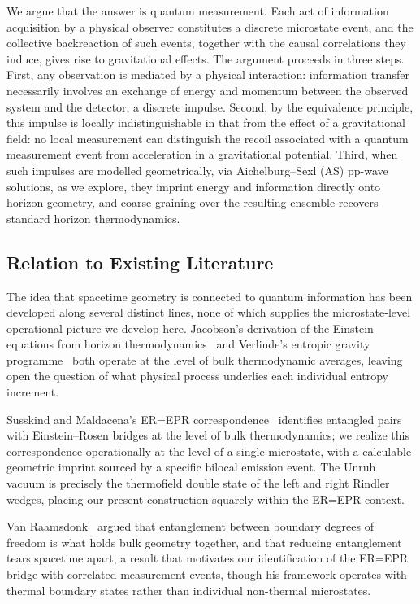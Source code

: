 \documentclass[12pt,a4paper]{article}
\begin{document}
We argue that the answer is quantum measurement. Each act of information acquisition by a physical observer constitutes a discrete microstate event, and the collective backreaction of such events, together with the causal correlations they induce, gives rise to gravitational effects. The argument proceeds in three steps. First, any observation is mediated by a physical interaction: information transfer necessarily involves an exchange of energy and momentum between the observed system and the detector, a discrete impulse. Second, by the equivalence principle, this impulse is locally indistinguishable in that from the effect of a gravitational field: no local measurement can distinguish the recoil associated with a quantum measurement event from acceleration in a gravitational potential. Third, when such impulses are modelled geometrically, via Aichelburg--Sexl (AS) pp-wave solutions, as we explore, they imprint energy and information directly onto horizon geometry, and coarse-graining over the resulting ensemble recovers standard horizon thermodynamics. 

\subsection{Relation to Existing Literature}
The idea that spacetime geometry is connected to quantum information 
has been developed along several distinct lines, none of which supplies 
the microstate-level operational picture we develop here. Jacobson's 
derivation of the Einstein equations from horizon thermodynamics~\cite{jacobson1995thermodynamics} 
and Verlinde's entropic gravity programme~\cite{entropic} both operate 
at the level of bulk thermodynamic averages, leaving open the question 
of what physical process underlies each individual entropy increment. 

Susskind and Maldacena's ER=EPR correspondence~\cite{maldacena2013cool} 
identifies entangled pairs with Einstein--Rosen bridges at the level 
of bulk thermodynamics; we realize this correspondence operationally 
at the level of a single microstate, with a calculable geometric 
imprint sourced by a specific bilocal emission event.
The Unruh vacuum is precisely the thermofield double state of 
the left and right Rindler wedges, placing our present 
construction squarely within the ER=EPR context.

Van Raamsdonk~\cite{van2010building} argued that entanglement between 
boundary degrees of freedom is what holds bulk geometry together, and 
that reducing entanglement tears spacetime apart, a result that 
motivates our identification of the ER=EPR bridge with correlated 
measurement events, though his framework operates with thermal 
boundary states rather than individual non-thermal microstates. 
\end{document}
